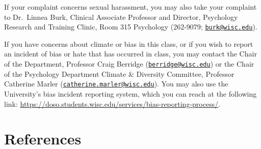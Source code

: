 \documentclass[11pt,man]{article}
\begin{document}
If your complaint concerns sexual harassment, you may also take your
complaint to Dr.~Linnea Burk, Clinical Associate Professor and Director,
Psychology Research and Training Clinic, Room 315 Psychology (262-9079;
\href{mailto:burk@wisc.edu}{\nolinkurl{burk@wisc.edu}}).

If you have concerns about climate or bias in this class, or if you wish
to report an incident of bias or hate that has occurred in class, you
may contact the Chair of the Department, Professor Craig Berridge
(\href{mailto:berridge@wisc.edu}{\nolinkurl{berridge@wisc.edu}}) or the
Chair of the Psychology Department Climate \& Diversity Committee,
Professor Catherine Marler
(\href{mailto:catherine.marler@wisc.edu}{\nolinkurl{catherine.marler@wisc.edu}}).
You may also use the University's bias incident reporting system, which
you can reach at the following link:
\url{https://doso.students.wisc.edu/services/bias-reporting-process/}.

\newpage

\hypertarget{references}{%
\section*{References}\label{references}}
\end{document}

